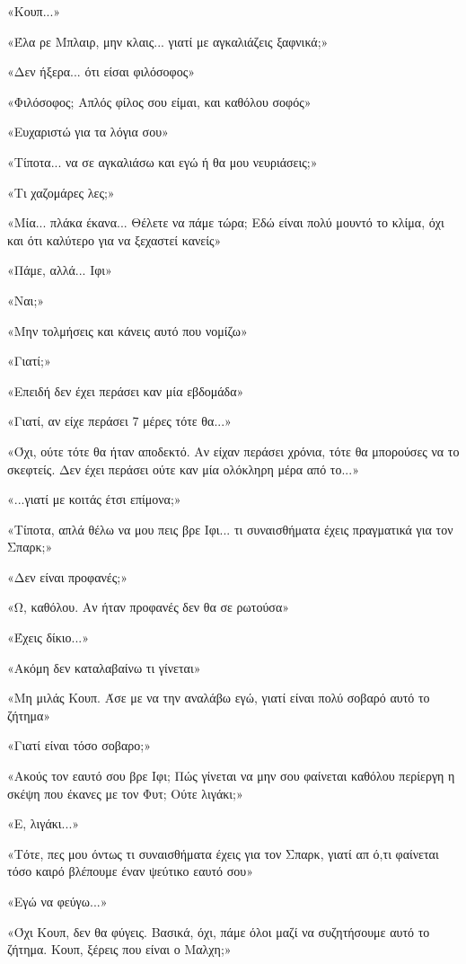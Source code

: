 \documentclass[12pt,twoside, openany]{book}
\begin{document}
«Κουπ...»

«Έλα ρε Μπλαιρ, μην κλαις... γιατί με αγκαλιάζεις ξαφνικά;»

«Δεν ήξερα... ότι είσαι φιλόσοφος»

«Φιλόσοφος; Απλός φίλος σου είμαι, και καθόλου σοφός»

«Ευχαριστώ για τα λόγια σου»

«Τίποτα... να σε αγκαλιάσω και εγώ ή θα μου νευριάσεις;»

«Τι χαζομάρες λες;»

«Μία... πλάκα έκανα... Θέλετε να πάμε τώρα; Εδώ είναι πολύ μουντό το κλίμα, όχι και ότι καλύτερο για να ξεχαστεί κανείς»

«Πάμε, αλλά... Ιφι»

«Ναι;»

«Μην τολμήσεις και κάνεις αυτό που νομίζω»

«Γιατί;»

«Επειδή δεν έχει περάσει καν μία εβδομάδα»

«Γιατί, αν είχε περάσει 7 μέρες τότε θα...»

«Όχι, ούτε τότε θα ήταν αποδεκτό. Αν είχαν περάσει χρόνια, τότε θα μπορούσες να το σκεφτείς. Δεν έχει περάσει ούτε καν μία ολόκληρη μέρα από το...»

«...γιατί με κοιτάς έτσι επίμονα;»

«Τίποτα, απλά θέλω να μου πεις βρε Ιφι... τι συναισθήματα έχεις πραγματικά για τον Σπαρκ;»

«Δεν είναι προφανές;»

«Ω, καθόλου. Αν ήταν προφανές δεν θα σε ρωτούσα»

«Έχεις δίκιο...»

«Ακόμη δεν καταλαβαίνω τι γίνεται»

«Μη μιλάς Κουπ. Άσε με να την αναλάβω εγώ, γιατί είναι πολύ σοβαρό αυτό το ζήτημα»

«Γιατί είναι τόσο σοβαρο;»

«Ακούς τον εαυτό σου βρε Ιφι; Πώς γίνεται να μην σου φαίνεται καθόλου περίεργη η σκέψη που έκανες με τον Φυτ; Ούτε λιγάκι;»

«Ε, λιγάκι...»

«Τότε, πες μου όντως τι συναισθήματα έχεις για τον Σπαρκ, γιατί απ ό,τι φαίνεται τόσο καιρό βλέπουμε έναν ψεύτικο εαυτό σου»

«Εγώ να φεύγω...»

«Όχι Κουπ, δεν θα φύγεις. Βασικά, όχι, πάμε όλοι μαζί να συζητήσουμε αυτό το ζήτημα. Κουπ, ξέρεις που είναι ο Μαλχη;»
\end{document}
